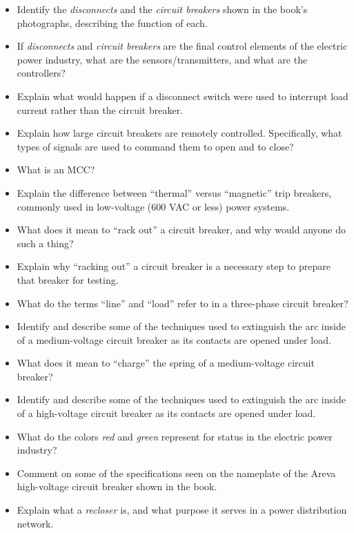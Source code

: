 \begin{itemize}
\item{} Identify the {\it disconnects} and the {\it circuit breakers} shown in the book's photographs, describing the function of each.
\item{} If {\it disconnects} and {\it circuit breakers} are the final control elements of the electric power industry, what are the sensors/transmitters, and what are the controllers?
\item{} Explain what would happen if a disconnect switch were used to interrupt load current rather than the circuit breaker.
\item{} Explain how large circuit breakers are remotely controlled.  Specifically, what types of signals are used to command them to open and to close?
\item{} What is an MCC?
\item{} Explain the difference between ``thermal'' versus ``magnetic'' trip breakers, commonly used in low-voltage (600 VAC or less) power systems.
\item{} What does it mean to ``rack out'' a circuit breaker, and why would anyone do such a thing?
\item{} Explain why ``racking out'' a circuit breaker is a necessary step to prepare that breaker for testing.
\item{} What do the terms ``line'' and ``load'' refer to in a three-phase circuit breaker?
\item{} Identify and describe some of the techniques used to extinguish the arc inside of a medium-voltage circuit breaker as its contacts are opened under load.
\item{} What does it mean to ``charge'' the spring of a medium-voltage circuit breaker?
\item{} Identify and describe some of the techniques used to extinguish the arc inside of a high-voltage circuit breaker as its contacts are opened under load.
\item{} What do the colors {\it red} and {\it green} represent for status in the electric power industry?
\item{} Comment on some of the specifications seen on the nameplate of the Areva high-voltage circuit breaker shown in the book.
\item{} Explain what a {\it recloser} is, and what purpose it serves in a power distribution network.
\end{itemize}











